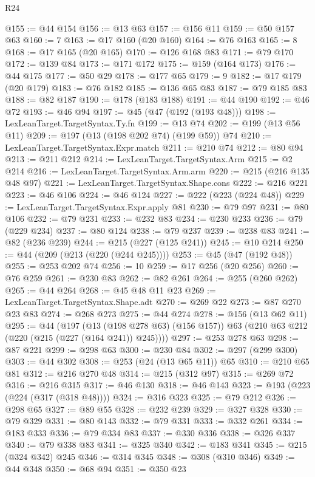 \begin{lexlean}{R24}
\begin{coremodule}
@155 := @44 @154
@156 := @13 @63
@157 := @156 @11
@159 := @50 @157 @63
@160 := 7
@163 := @17 @160 (@20 @160)
@164 := @76 @163
@165 := 8
@168 := @17 @165 (@20 @165)
@170 := @126 @168 @83
@171 := @79 @170
@172 := @139 @84
@173 := @171 @172
@175 := @159 (@164 @173)
@176 := @44 @175
@177 := @50 @29
@178 := @177 @65
@179 := 9
@182 := @17 @179 (@20 @179)
@183 := @76 @182
@185 := @136 @65 @83
@187 := @79 @185 @83
@188 := @82 @187
@190 := @178 (@183 @188)
@191 := @44 @190
@192 := @46 @72
@193 := @46 @94
@197 := @45 (@47 (@192 (@193 @48)))
@198 := LexLeanTarget.TargetSyntax.Ty.fn
@199 := @13 @74
@202 := @199 (@13 @56 @11)
@209 := @197 (@13 (@198 @202 @74) (@199 @59)) @74
@210 := LexLeanTarget.TargetSyntax.Expr.match
@211 := @210 @74
@212 := @80 @94
@213 := @211 @212
@214 := LexLeanTarget.TargetSyntax.Arm
@215 := @2 @214
@216 := LexLeanTarget.TargetSyntax.Arm.arm
@220 := @215 (@216 @135 @48 @97)
@221 := LexLeanTarget.TargetSyntax.Shape.cons
@222 := @216 @221
@223 := @46 @106
@224 := @46 @124
@227 := @222 (@223 (@224 @48))
@229 := LexLeanTarget.TargetSyntax.Expr.apply @81
@230 := @79 @97
@231 := @80 @106
@232 := @79 @231
@233 := @232 @83
@234 := @230 @233
@236 := @79 (@229 @234)
@237 := @80 @124
@238 := @79 @237
@239 := @238 @83
@241 := @82 (@236 @239)
@244 := @215 (@227 (@125 @241))
@245 := @10 @214
@250 := @44 (@209 (@213 (@220 (@244 @245))))
@253 := @45 (@47 (@192 @48))
@255 := @253 @202 @74
@256 := 10
@259 := @17 @256 (@20 @256)
@260 := @76 @259
@261 := @230 @83
@262 := @82 @261
@264 := @255 (@260 @262)
@265 := @44 @264
@268 := @45 @48 @11 @23
@269 := LexLeanTarget.TargetSyntax.Shape.adt
@270 := @269 @22
@273 := @87 @270 @23 @83
@274 := @268 @273
@275 := @44 @274
@278 := @156 (@13 @62 @11)
@295 := @44
    (@197
      (@13 (@198 @278 @63) (@156 @157))
      @63
      (@210 @63 @212 (@220 (@215 (@227 (@164 @241)) @245))))
@297 := @253 @278 @63
@298 := @87 @221
@299 := @298 @63
@300 := @230 @84
@302 := @297 (@299 @300)
@303 := @44 @302
@308 := @253 (@24 (@13 @65 @11)) @65
@310 := @210 @65 @81
@312 := @216 @270 @48
@314 := @215 (@312 @97)
@315 := @269 @72
@316 := @216 @315
@317 := @46 @130
@318 := @46 @143
@323 := @193 (@223 (@224 (@317 (@318 @48))))
@324 := @316 @323
@325 := @79 @212
@326 := @298 @65
@327 := @89 @55
@328 := @232 @239
@329 := @327 @328
@330 := @79 @329
@331 := @80 @143
@332 := @79 @331
@333 := @332 @261
@334 := @183 @333
@336 := @79 @334 @83
@337 := @330 @336
@338 := @326 @337
@340 := @79 @338 @83
@341 := @325 @340
@342 := @183 @341
@345 := @215 (@324 @342) @245
@346 := @314 @345
@348 := @308 (@310 @346)
@349 := @44 @348
@350 := @68 @94
@351 := @350 @23

\end{coremodule}
\end{lexlean}
